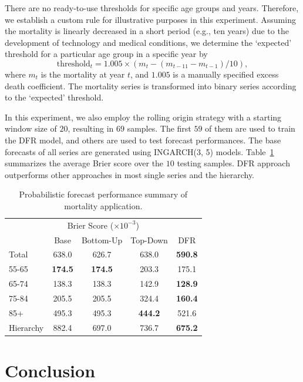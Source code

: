 \documentclass[a4paper,review,12pt,authoryear]{elsarticle}
\begin{document}
     There are no ready-to-use thresholds for specific age groups and years. 
     Therefore, we establish a custom rule for illustrative purposes in this experiment. 
     Assuming the mortality is linearly decreased in a short period (e.g., ten years) due to the development of technology and medical conditions, we determine the `expected' threshold for a particular age group in a specific year by
     \[
       \text{threshold}_t = 1.005 \times (m_t - (m_{t-11} - m_{t-1})/10),
     \]
     where $m_t$ is the mortality at year $t$, and $1.005$ is a manually specified excess death coefficient.
     The mortality series is transformed into binary series according to the `expected' threshold. 
     
     In this experiment, we also employ the rolling origin strategy with a starting window size of $20$, resulting in $69$ samples.
     The first $59$ of them are used to train the DFR model, and others are used to test forecast performances.
     The base forecasts of all series are generated using INGARCH(3, 5) models. Table~\ref{tab:mortality_age} summarizes the average Brier score over the $10$ testing samples. 
     DFR approach outperforms other approaches in most single series and the hierarchy. 
     
     
     \begin{table}
       \centering
       \caption{\label{tab:mortality_age} Probabilistic forecast performance summary of mortality application.}
       \begin{tabular}{lcccc}
       \toprule
       \multicolumn{5}{c}{Brier Score ($\times 10^{-3}$)}\\ 
       & Base & Bottom-Up & Top-Down & DFR \\\midrule
       Total & 638.0 & 626.7 & 638.0 & \textbf{590.8} \\
       55-65 & \textbf{174.5} & \textbf{174.5} & 203.3 & 175.1 \\
       65-74 & 138.3 & 138.3 & 142.9 & \textbf{128.9}\\
       75-84 & 205.5 & 205.5 & 324.4 & \textbf{160.4}\\
       85+ & 495.3 & 495.3 & \textbf{444.2} & 521.6\\
       Hierarchy & 882.4 & 697.0 & 736.7 & \textbf{675.2} \\
       \bottomrule
      \end{tabular}
     \end{table}
     
     \section{Conclusion}
     \label{sec:conclusion}
     
\end{document}
